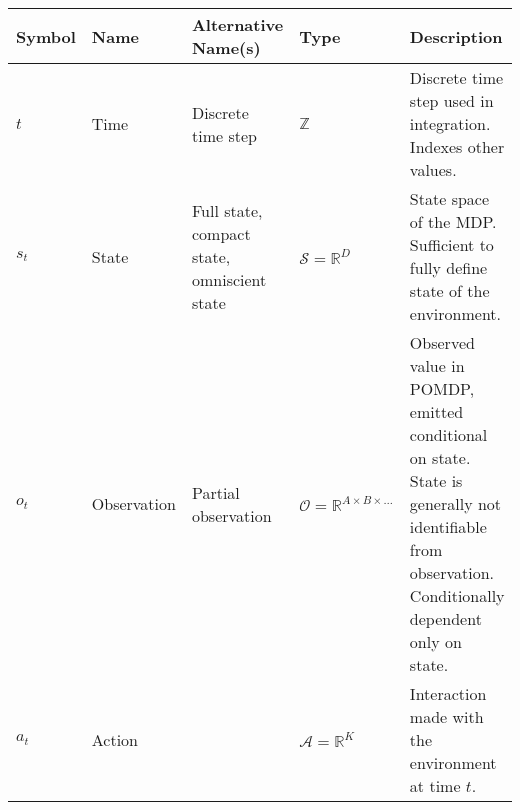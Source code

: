 
\renewcommand{\arraystretch}{1.5}
\begin{minipage}{\textwidth}
\centering
\begin{adjustwidth}{-.5in}{-.5in}  
\begin{center}
\tiny
\begin{tabular}{@{}p{2cm}p{2cm}p{2cm}p{3cm}p{6.5cm}@{}}
\toprule
Symbol                             & Name                         & Alternative Name(s)                                             & Type                                                                                                                              & Description                                                                                                                                                                   \\ \hline
$t$                                & Time                         & Discrete time step                                              & $\mathbb{Z}$                                                                                                                      & Discrete time step used in integration.  Indexes other values.                                                                                                                \\
$s_t$                              & State                        & Full state, compact state, omniscient state                     & $\mathcal{S} = \mathbb{R}^D$                                                                                                      & State space of the MDP.  Sufficient to fully define state of the environment.                                                                                                 \\
$o_t$                              & Observation                  & Partial observation                                             & $\mathcal{O} = \mathbb{R}^{A\times B \times \dots}$                                                                               & Observed value in POMDP, emitted conditional on state.  State is generally not identifiable from observation. Conditionally dependent only on state.                          \\
$a_t$                              & Action                       &                                                                 & $\mathcal{A} = \mathbb{R}^K$                                                                                                      & Interaction made with the environment at time $t$.                                                                                                                            \\

\end{tabular}
\end{center}
\end{adjustwidth}
\end{minipage}
